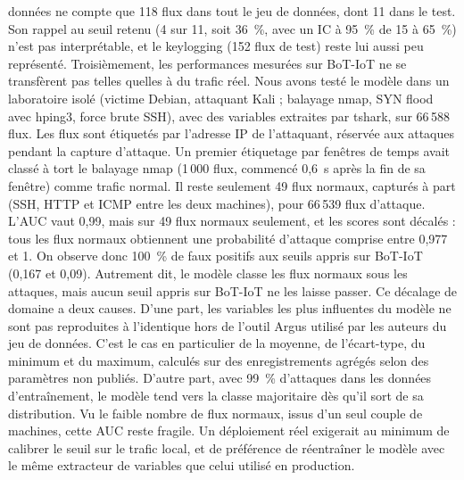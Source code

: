 données ne compte que 118 flux dans tout le jeu de données, dont 11 dans le test. Son rappel au
seuil retenu (4 sur 11, soit 36~\%, avec un IC à 95~\% de 15 à 65~\%) n'est pas interprétable,
et le keylogging (152 flux de test) reste lui aussi peu représenté. Troisièmement, les
performances mesurées sur BoT-IoT ne se transfèrent pas telles quelles à du trafic réel. Nous
avons testé le modèle dans un laboratoire isolé (victime Debian, attaquant Kali ; balayage nmap,
SYN flood avec hping3, force brute SSH), avec des variables extraites par tshark, sur 66\,588
flux. Les flux sont étiquetés par l'adresse IP de l'attaquant, réservée aux attaques pendant la
capture d'attaque. Un premier étiquetage par fenêtres de temps avait classé à tort le balayage
nmap (1\,000 flux, commencé 0,6~s après la fin de sa fenêtre) comme trafic normal. Il reste
seulement 49 flux normaux, capturés à part (SSH, HTTP et ICMP entre les deux machines), pour
66\,539 flux d'attaque. L'AUC vaut 0,99, mais sur 49 flux normaux seulement, et les scores sont
décalés : tous les flux normaux obtiennent une probabilité d'attaque comprise entre 0,977
et 1. On observe donc 100~\% de faux positifs aux seuils appris sur BoT-IoT (0,167 et 0,09).
Autrement dit, le modèle classe les flux normaux sous les attaques, mais aucun seuil appris
sur BoT-IoT ne les laisse passer. Ce décalage de domaine a deux causes. D'une part, les
variables les plus influentes du modèle ne sont pas reproduites à l'identique hors de l'outil
Argus utilisé par les auteurs du jeu de données. C'est le cas en particulier de la moyenne, de
l'écart-type, du minimum et du maximum, calculés sur des enregistrements agrégés selon des
paramètres non publiés. D'autre part, avec 99~\% d'attaques dans les données d'entraînement,
le modèle tend vers la classe majoritaire dès qu'il sort de sa distribution. Vu le faible
nombre de flux normaux, issus d'un seul couple de machines, cette AUC reste fragile. Un
déploiement réel exigerait au minimum de calibrer le seuil sur le trafic local, et de
préférence de réentraîner le modèle avec le même extracteur de variables que celui utilisé en
production.
